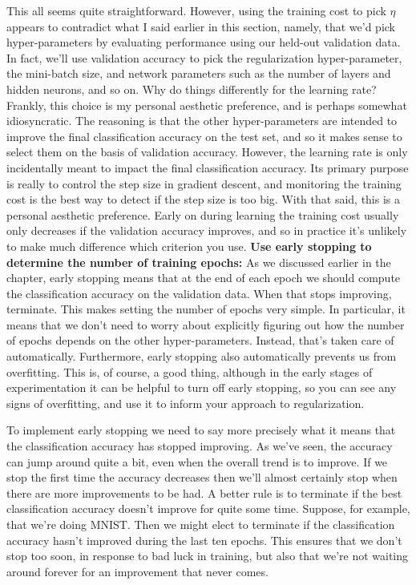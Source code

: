 This all seems quite straightforward. However, using the training cost to pick $\eta$ appears to contradict what I said earlier in this section, namely, that we'd pick hyper-parameters by evaluating performance using our held-out validation data. In fact, we'll use validation accuracy to pick the regularization hyper-parameter, the mini-batch size, and network parameters such as the number of layers and hidden neurons, and so on. Why do things differently for the learning rate? Frankly, this choice is my personal aesthetic preference, and is perhaps somewhat idiosyncratic. The reasoning is that the other hyper-parameters are intended to improve the final classification accuracy on the test set, and so it makes sense to select them on the basis of validation accuracy. However, the learning rate is only incidentally meant to impact the final classification accuracy. Its primary purpose is really to control the step size in gradient descent, and monitoring the training cost is the best way to detect if the step size is too big. With that said, this is a personal aesthetic preference. Early on during learning the training cost usually only decreases if the validation accuracy improves, and so in practice it's unlikely to make much difference which criterion you use. \textbf{Use early stopping to determine the number of training epochs:} As we discussed earlier in the chapter, early stopping means that at the end of each epoch we should compute the classification accuracy on the validation data. When that stops improving, terminate. This makes setting the number of epochs very simple. In particular, it means that we don't need to worry about explicitly figuring out how the number of epochs depends on the other hyper-parameters. Instead, that's taken care of automatically. Furthermore, early stopping also automatically prevents us from overfitting. This is, of course, a good thing, although in the early stages of experimentation it can be helpful to turn off early stopping, so you can see any signs of overfitting, and use it to inform your approach to regularization.


To implement early stopping we need to say more precisely what it means that the classification accuracy has stopped improving. As we've seen, the accuracy can jump around quite a bit, even when the overall trend is to improve. If we stop the first time the accuracy decreases then we'll almost certainly stop when there are more improvements to be had. A better rule is to terminate if the best classification accuracy doesn't improve for quite some time. Suppose, for example, that we're doing MNIST. Then we might elect to terminate if the classification accuracy hasn't improved during the last ten epochs. This ensures that we don't stop too soon, in response to bad luck in training, but also that we're not waiting around forever for an improvement that never comes.


